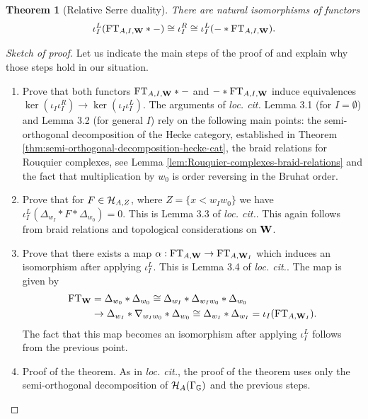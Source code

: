 \documentclass[a4paper, 10pt, oneside, reqno]{amsart}
\theoremstyle{plain}
\newtheorem{thm}{Theorem}[subsection]
\theoremstyle{definition}
\theoremstyle{remark}
\newcommand{\Gbb}{\mathbb{G}}
\newcommand{\FT}{\mathrm{FT}}
\begin{document}
\begin{thm}[Relative Serre duality]\label{thm:relative-Serre-duality}
There are natural isomorphisms of functors
$$\iota^L_I(\FT_{A,I,\Wbf} * -) \cong \iota^R_I \cong \iota^L_I(- * \FT_{A,I,\Wbf}).$$
\end{thm}

\begin{proof}[Sketch of proof]
Let us indicate the main steps of the proof of \cite{SandvikRelativeSerreDuality, HoLiRelativeSerre} and explain why those steps hold in our situation. 
\begin{enumerate}
\item[Step 1.] Prove that both functors $\FT_{A,I,\Wbf} * -$ and $-*\FT_{A,I,\Wbf}$ induce equivalences $\ker(\iota_I\iota_I^R) \to \ker(\iota_I\iota_I^L)$. The arguments of \emph{loc. cit.} Lemma 3.1 (for $I = \emptyset$) and Lemma 3.2 (for general $I$) rely on the following main points: the semi-orthogonal decomposition of the Hecke category, established in Theorem \ref{thm:semi-orthogonal-decomposition-hecke-cat}, the braid relations for Rouquier complexes, see Lemma \ref{lem:Rouquier-complexes-braid-relations} and the fact that multiplication by $w_0$ is order reversing in the Bruhat order. 
\item [Step 2.] Prove that for $F \in \mathcal{H}_{A,Z}$, where $Z = \{x < w_Iw_0\}$ we have $\iota_I^L(\Delta_{w_I} * F * \Delta_{w_0}) = 0$. This is Lemma 3.3 of \emph{loc. cit.}. This again follows from braid relations and topological considerations on $\mathbf{W}$. 
\item [Step 3.] Prove that there exists a map $\alpha : \FT_{A, \Wbf} \to \FT_{A,\Wbf_{I}}$ which induces an isomorphism after applying $\iota_I^L$. This is Lemma 3.4 of \emph{loc. cit.}. The map is given by
\begin{align*}
\FT_{\Wbf} &= \Delta_{w_0} * \Delta_{w_0} \cong \Delta_{w_I} * \Delta_{w_Iw_0} * \Delta_{w_0} \\
&\to \Delta_{w_I} * \nabla_{w_Iw_0} * \Delta_{w_0} \cong \Delta_{w_I} * \Delta_{w_I} = \iota_I(\FT_{A, \Wbf_I}).
\end{align*}
The fact that this map becomes an isomorphism after applying $\iota_I^L$ follows from the previous point.
\item [Step 4.] Proof of the theorem. As in \emph{loc. cit.}, the proof of the theorem uses only the semi-orthogonal decomposition of $\Hcal_A(\Gamma_{\Gbb})$ and the previous steps. 
\end{enumerate}
\end{proof}
\end{document}
